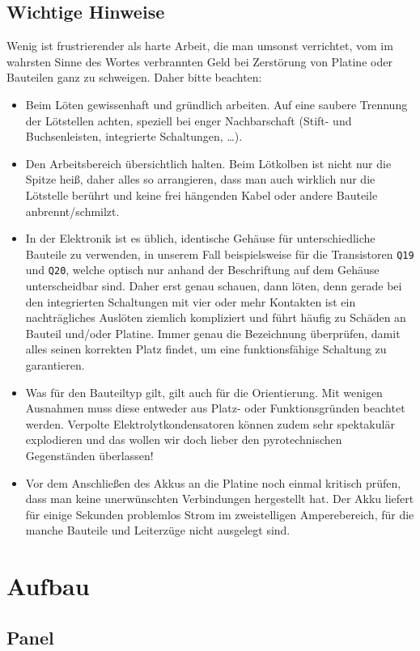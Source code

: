 \documentclass[paper=a4, open=any]{scrbook}
\begin{document}
		\section{Wichtige Hinweise}
			Wenig ist frustrierender als harte Arbeit, die man umsonst verrichtet, vom im wahrsten Sinne des Wortes verbrannten Geld bei Zerstörung von Platine oder Bauteilen ganz zu schweigen. Daher bitte beachten:
			\begin{itemize}
				\item Beim Löten gewissenhaft und gründlich arbeiten. Auf eine saubere Trennung der Lötstellen achten, speziell bei enger Nachbarschaft (Stift- und Buchsenleisten, integrierte Schaltungen, \dots).
				\item Den Arbeitsbereich übersichtlich halten. Beim Lötkolben ist nicht nur die Spitze heiß, daher alles so arrangieren, dass man auch wirklich nur die Lötstelle berührt und keine frei hängenden Kabel oder andere Bauteile anbrennt/schmilzt.
				\item In der Elektronik ist es üblich, identische Gehäuse für unterschiedliche Bauteile zu verwenden, in unserem Fall beispielsweise für die Transistoren \texttt{Q19} und \texttt{Q20}, welche optisch nur anhand der Beschriftung auf dem Gehäuse unterscheidbar sind. Daher erst genau schauen, dann löten, denn gerade bei den integrierten Schaltungen mit vier oder mehr Kontakten ist ein nachträgliches Auslöten ziemlich kompliziert und führt häufig zu Schäden an Bauteil und/oder Platine. Immer genau die Bezeichnung überprüfen, damit alles seinen korrekten Platz findet, um eine funktionsfähige Schaltung zu garantieren.
				\item Was für den Bauteiltyp gilt, gilt auch für die Orientierung. Mit wenigen Ausnahmen muss diese entweder aus Platz- oder Funktionsgründen beachtet werden. Verpolte Elektrolytkondensatoren können zudem sehr spektakulär explodieren und das wollen wir doch lieber den pyrotechnischen Gegenständen überlassen!
				\item Vor dem Anschließen des Akkus an die Platine noch einmal kritisch prüfen, dass man keine unerwünschten Verbindungen hergestellt hat. Der Akku liefert für einige Sekunden problemlos Strom im zweistelligen Amperebereich, für die manche Bauteile und Leiterzüge nicht ausgelegt sind.
			\end{itemize}
	\chapter{Aufbau}
		\section{Panel}
\end{document}
